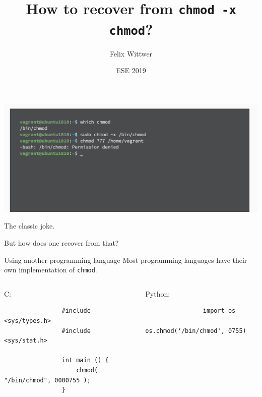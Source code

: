 \documentclass[aspectratio=169]{beamer}
\title{How to recover from \texttt{chmod -x chmod}?}
\author{Felix Wittwer}
\date{ESE 2019}
\institute{NERD101 - TU Dresden}
\begin{document}
\maketitle

\begin{frame}
    \centering
    \includegraphics[width=.75\textwidth, keepaspectratio]{chmod.png}
    \pause

    The classic joke.

    But how does one recover from that? 
\end{frame}

\begin{frame}[fragile]{Using another programming language}
    \flushleft
    Most programming languages have their own implementation of \texttt{chmod}.
    \pause
    \vfill
    \begin{columns}[onlytextwidth]
        \begin{column}{.5\textwidth}
            C:
            \begin{verbatim}
                #include <sys/types.h>
                #include <sys/stat.h>

                int main () {
                    chmod( "/bin/chmod", 0000755 );
                }
            \end{verbatim}
        \end{column}
        \begin{column}{.5\textwidth}
            \pause
            Python:
            \begin{verbatim}
                import os
                os.chmod('/bin/chmod', 0755)
            \end{verbatim}
        \end{column}
    \end{columns}
\end{frame}
\end{document}
